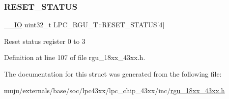 \subsubsection{\texorpdfstring{R\+E\+S\+E\+T\+\_\+\+S\+T\+A\+T\+US}{RESET\_STATUS}}
{\footnotesize\ttfamily \hyperlink{core__sc300_8h_aec43007d9998a0a0e01faede4133d6be}{\+\_\+\+\_\+\+IO} uint32\+\_\+t L\+P\+C\+\_\+\+R\+G\+U\+\_\+\+T\+::\+R\+E\+S\+E\+T\+\_\+\+S\+T\+A\+T\+US\mbox{[}4\mbox{]}}

Reset status register 0 to 3 

Definition at line 107 of file rgu\+\_\+18xx\+\_\+43xx.\+h.



The documentation for this struct was generated from the following file\+:\begin{DoxyCompactItemize}
\item 
muju/externals/base/soc/lpc43xx/lpc\+\_\+chip\+\_\+43xx/inc/\hyperlink{rgu__18xx__43xx_8h}{rgu\+\_\+18xx\+\_\+43xx.\+h}\end{DoxyCompactItemize}

